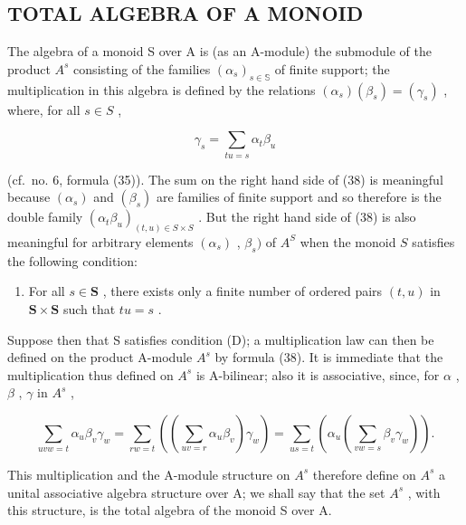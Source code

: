 \subsection{TOTAL ALGEBRA OF A MONOID}

The algebra of a monoid S over A is (as an A-module) the submodule of the product \(A^{s}\) consisting of the families \((\alpha_{s})_{s\in\mathbb{S}}\) of finite support; the multiplication in this algebra is defined by the relations \((\alpha_{s})(\beta_{s})=(\gamma_{s})\) , where, for all \(s\in S\) ,

\[
\gamma_ {s} = \sum_ {t u = s} \alpha_ {t} \beta_ {u}\tag{38}
\]

(cf.~no. 6, formula (35)). The sum on the right hand side of (38) is meaningful because \((\alpha_{s})\) and \((\beta_{s})\) are families of finite support and so therefore is the double family \((\alpha_{t}\beta_{u})_{(t,u)\in S\times S}\) . But the right hand side of (38) is also meaningful for arbitrary elements \((\alpha_{s})\) , \(\beta_{s})\) of \(A^{S}\) when the monoid \(S\) satisfies the following condition:

\begin{enumerate}
\def\labelenumi{(\Alph{enumi})}
\setcounter{enumi}{3}
\tightlist
\item
  For all \(s \in \mathbf{S}\) , there exists only a finite number of ordered pairs \((t, u)\) in \(\mathbf{S} \times \mathbf{S}\) such that \(tu = s\) .
\end{enumerate}

Suppose then that S satisfies condition (D); a multiplication law can then be defined on the product A-module \(A^{s}\) by formula (38). It is immediate that the multiplication thus defined on \(A^{s}\) is A-bilinear; also it is associative, since, for \(\alpha\) , \(\beta\) , \(\gamma\) in \(A^{s}\) ,

\[
\sum_ {u v w = t} \alpha_ {u} \beta_ {v} \gamma_ {w} = \sum_ {r w = t} \left(\left(\sum_ {u v = r} \alpha_ {u} \beta_ {v}\right) \gamma_ {w}\right) = \sum_ {u s = t} \left(\alpha_ {u} \left(\sum_ {v w = s} \beta_ {v} \gamma_ {w}\right)\right).
\]

This multiplication and the A-module structure on \(A^{s}\) therefore define on \(A^{s}\) a unital associative algebra structure over A; we shall say that the set \(A^{s}\) , with this structure, is the total algebra of the monoid S over A.

